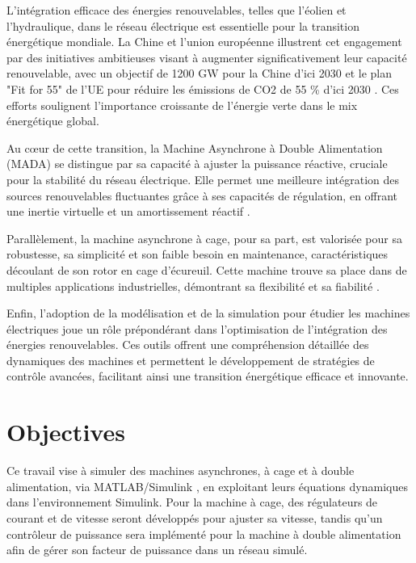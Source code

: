 
  L'intégration efficace des énergies renouvelables, telles que l'éolien et l'hydraulique, dans le réseau électrique est essentielle pour la transition énergétique mondiale. La Chine et l'union européenne illustrent cet engagement par des initiatives ambitieuses visant à augmenter significativement leur capacité renouvelable, avec un objectif de 1200 GW pour la Chine d'ici 2030 \cite{ChinaWindIntegration} et le plan "Fit for 55" de l'UE pour réduire les émissions de CO2 de 55 \% d'ici 2030 \cite{EuropeEnergyTransition}. Ces efforts soulignent l'importance croissante de l'énergie verte dans le mix énergétique global.

Au cœur de cette transition, la Machine Asynchrone à Double Alimentation (MADA) se distingue par sa capacité à ajuster la puissance réactive, cruciale pour la stabilité du réseau électrique. Elle permet une meilleure intégration des sources renouvelables fluctuantes grâce à ses capacités de régulation, en offrant une inertie virtuelle et un amortissement réactif \cite{Qi2023DFIG}.

Parallèlement, la machine asynchrone à cage, pour sa part, est valorisée pour sa robustesse, sa simplicité et son faible besoin en maintenance, caractéristiques découlant de son rotor en cage d'écureuil. Cette machine trouve sa place dans de multiples applications industrielles, démontrant sa flexibilité et sa fiabilité \cite{Qi2023DFIG}.

Enfin, l'adoption de la modélisation et de la simulation pour étudier les machines électriques joue un rôle prépondérant dans l'optimisation de l'intégration des énergies renouvelables. Ces outils offrent une compréhension détaillée des dynamiques des machines et permettent le développement de stratégies de contrôle avancées, facilitant ainsi une transition énergétique efficace et innovante.

    \section{Objectives}

   Ce travail vise à simuler des machines asynchrones, à cage et à double alimentation, via MATLAB/Simulink \cite{MATLAB} \cite{Simulink}, en exploitant leurs équations dynamiques dans l'environnement Simulink. Pour la machine à cage, des régulateurs de courant et de vitesse seront développés pour ajuster sa vitesse, tandis qu'un contrôleur de puissance sera implémenté pour la machine à double alimentation afin de gérer son facteur de puissance dans un réseau simulé.